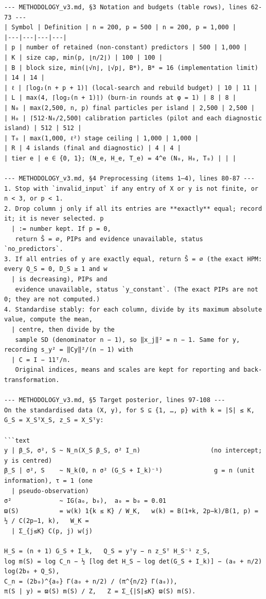 \documentclass[11pt]{article}
\theoremstyle{remark}
\begin{document}
\begin{Verbatim}[fontsize=\footnotesize,formatcom=\qfont]
--- METHODOLOGY_v3.md, §3 Notation and budgets (table rows), lines 62-73 ---
| Symbol | Definition | n = 200, p = 500 | n = 200, p = 1,000 |
|---|---|---|---|
| p | number of retained (non-constant) predictors | 500 | 1,000 |
| K | size cap, min(p, ⌊n/2⌋) | 100 | 100 |
| B | block size, min(⌊√n⌋, ⌊√p⌋, B*), B* = 16 (implementation limit) | 14 | 14 |
| ℓ | ⌈log₂(n + p + 1)⌉ (local-search and rebuild budget) | 10 | 11 |
| L | max(4, ⌈log₂(n + 1)⌉) (burn-in rounds at φ = 1) | 8 | 8 |
| N₀ | max(2,500, n, p) final particles per island | 2,500 | 2,500 |
| H₀ | ⌈512·N₀/2,500⌉ calibration particles (pilot and each diagnostic island) | 512 | 512 |
| T₀ | max(1,000, ℓ²) stage ceiling | 1,000 | 1,000 |
| R | 4 islands (final and diagnostic) | 4 | 4 |
| tier e | e ∈ {0, 1}; (N_e, H_e, T_e) = 4^e (N₀, H₀, T₀) | | |

--- METHODOLOGY_v3.md, §4 Preprocessing (items 1–4), lines 80-87 ---
1. Stop with `invalid_input` if any entry of X or y is not finite, or n < 3, or p < 1.
2. Drop column j only if all its entries are **exactly** equal; record it; it is never selected. p
  | := number kept. If p = 0,
   return Ŝ = ∅, PIPs and evidence unavailable, status `no_predictors`.
3. If all entries of y are exactly equal, return Ŝ = ∅ (the exact HPM: every Q_S = 0, D_S ≥ 1 and w
  | is decreasing), PIPs and
   evidence unavailable, status `y_constant`. (The exact PIPs are not 0; they are not computed.)
4. Standardise stably: for each column, divide by its maximum absolute value, compute the mean,
  | centre, then divide by the
   sample SD (denominator n − 1), so ‖x_j‖² = n − 1. Same for y, recording s_y² = ‖Cy‖²/(n − 1) with
  | C = I − 11ᵀ/n.
   Original indices, means and scales are kept for reporting and back-transformation.

--- METHODOLOGY_v3.md, §5 Target posterior, lines 97-108 ---
On the standardised data (X, y), for S ⊆ {1, …, p} with k = |S| ≤ K, G_S = X_SᵀX_S, z_S = X_Sᵀy:

```text
y | β_S, σ², S ~ N_n(X_S β_S, σ² I_n)                   (no intercept; y is centred)
β_S | σ², S    ~ N_k(0, n σ² (G_S + I_k)⁻¹)              g = n (unit information), τ = 1 (one
  | pseudo-observation)
σ²             ~ IG(a₀, b₀),  a₀ = b₀ = 0.01
ϖ(S)           = w(k) 1{k ≤ K} / W_K,   w(k) = B(1+k, 2p−k)/B(1, p) = ½ / C(2p−1, k),   W_K =
  | Σ_{j≤K} C(p, j) w(j)

H_S = (n + 1) G_S + I_k,   Q_S = yᵀy − n z_Sᵀ H_S⁻¹ z_S,
log m(S) = log C_n − ½ [log det H_S − log det(G_S + I_k)] − (a₀ + n/2) log(2b₀ + Q_S),
C_n = (2b₀)^{a₀} Γ(a₀ + n/2) / (π^{n/2} Γ(a₀)),
π(S | y) = ϖ(S) m(S) / Z,   Z = Σ_{|S|≤K} ϖ(S) m(S).


\end{Verbatim}
\end{document}
